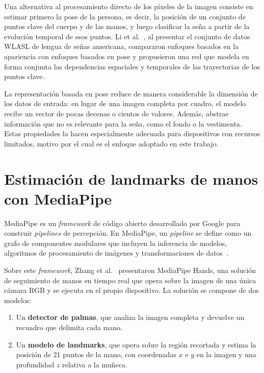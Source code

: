Una alternativa al procesamiento directo de los píxeles de la imagen consiste en estimar primero la pose de la persona, es decir, la posición de un conjunto de puntos clave del cuerpo y de las manos, y luego clasificar la seña a partir de la evolución temporal de esos puntos. Li et al.~\cite{li2020wlasl}, al presentar el conjunto de datos WLASL de lengua de señas americana, compararon enfoques basados en la apariencia con enfoques basados en pose y propusieron una red que modela en forma conjunta las dependencias espaciales y temporales de las trayectorias de los puntos clave.

La representación basada en pose reduce de manera considerable la dimensión de los datos de entrada: en lugar de una imagen completa por cuadro, el modelo recibe un vector de pocas decenas o cientos de valores. Además, abstrae información que no es relevante para la seña, como el fondo o la vestimenta. Estas propiedades la hacen especialmente adecuada para dispositivos con recursos limitados, motivo por el cual es el enfoque adoptado en este trabajo.

\section{Estimación de landmarks de manos con MediaPipe}

MediaPipe es un \emph{framework} de código abierto desarrollado por Google para construir \emph{pipelines} de percepción. En MediaPipe, un \emph{pipeline} se define como un grafo de componentes modulares que incluyen la inferencia de modelos, algoritmos de procesamiento de imágenes y transformaciones de datos~\cite{lugaresi2019mediapipe}.

Sobre este \emph{framework}, Zhang et al.~\cite{zhang2020mediapipehands} presentaron MediaPipe Hands, una solución de seguimiento de manos en tiempo real que opera sobre la imagen de una única cámara RGB y se ejecuta en el propio dispositivo. La solución se compone de dos modelos:

\begin{enumerate}
    \item Un \textbf{detector de palmas}, que analiza la imagen completa y devuelve un recuadro que delimita cada mano.
    \item Un \textbf{modelo de landmarks}, que opera sobre la región recortada y estima la posición de 21 puntos de la mano, con coordenadas $x$ e $y$ en la imagen y una profundidad $z$ relativa a la muñeca.
\end{enumerate}

